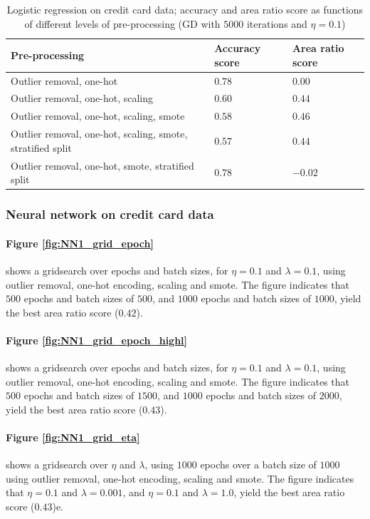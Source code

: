 \documentclass[%
oneside,                 %
final,                   %
10pt]{article}
\begin{document}
\begin{table}[h!]
\begin{center}
\begin{tabular}{lll}
\hline
 Pre-processing  & Accuracy score & Area ratio score      \\
\hline
 Outlier removal, one-hot               & $ 0.78 $ & $0.00$ \\
 Outlier removal, one-hot, scaling               & $  0.60 $ & $0.44$ \\
 Outlier removal, one-hot, scaling, smote  &$0.58$ & $0.46$  \\
 Outlier removal, one-hot, scaling, smote, stratified split    & $0.57$ & $0.44     $   \\
 Outlier removal, one-hot, smote, stratified split    & $0.78$ & $-0.02 $ 
   \\  
\hline
\end{tabular}
\end{center}
\caption{Logistic regression on credit card data; accuracy and area ratio score as functions of different levels of pre-processing (GD with $5000$ iterations and $\eta=0.1$)}
\label{table:PP_scores}
\end{table}
\subsubsection{Neural network on credit card data}

\paragraph{Figure \ref{fig:NN1_grid_epoch}} shows a gridsearch over epochs and batch sizes, for $\eta=0.1$ and $\lambda=0.1$, using outlier removal, one-hot encoding, scaling and smote. The figure indicates that  $500$ epochs and batch sizes of $500$, and  $1000$ epochs and batch sizes of $1000$, yield the best area ratio score ($0.42$).

\paragraph{Figure \ref{fig:NN1_grid_epoch_highl}} shows a gridsearch over epochs and batch sizes, for $\eta=0.1$ and $\lambda=0.1$, using outlier removal, one-hot encoding, scaling and smote. The figure indicates that  $500$ epochs and batch sizes of $1500$, and  $1000$ epochs and batch sizes of $2000$, yield the best area ratio score ($0.43$).

\paragraph{Figure \ref{fig:NN1_grid_eta}}
shows a gridsearch over  $\eta$ and $\lambda$, using $1000$ epochs over a batch size of $1000$ using outlier removal, one-hot encoding, scaling and smote. The figure indicates that  $\eta=0.1$ and $\lambda=0.001$, and $\eta=0.1$ and $\lambda=1.0$, yield the best area ratio score ($0.43$)e.
\end{document}
